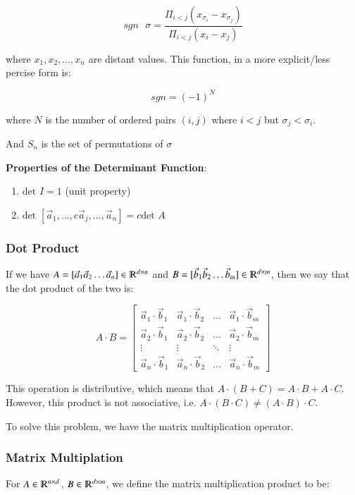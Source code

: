 \documentclass [12 pt, twoside] {book}
\newcommand\+{\text{ }}
\newcommand{\det}{\text{det }}
\begin{document}
$$sgn \+ \sigma = \frac{\Pi_{i < j} (x_{\sigma_i} - x_{\sigma_j})}{\Pi_{i
< j} (x_i - x_j)}$$

where $x_1, x_2, \dots, x_n$ are distant values. This function, in a more
explicit/less percise form is:

$$sgn = (-1)^N$$

where $N$ is the number of ordered pairs $(i, j)$ where $i < j$ but $\sigma_j <
\sigma_i$.

And $S_n$ is the set of permutations of $\sigma$

\textbf{Properties of the Determinant Function}:
\begin{enumerate}
    \item $\det I = 1$ (unit property)
    \item $\det[\vec{a}_1, \dots, c\vec{a}_j, \dots, \vec{a}_n] = c \det A$
\end{enumerate}

\subsubsection{Dot Product}
If we have $A = [\vec{a}_1 \vec{a}_2 \dots \vec{a}_n]
\in \varmathbb{R}^{d \times n}$ and $B = [\vec{b}_1 \vec{b}_2 \dots \vec{b}_m]
\in \varmathbb{R}^{d \times m}$, then we say that the dot product of the two is:

\[
    A \cdot B = \left[\begin{array}{cccc}
        \vec{a}_1 \cdot \vec{b}_1 & \vec{a}_1 \cdot \vec{b}_2 & \dots &
        \vec{a}_1 \cdot \vec{b}_m \\
        \vec{a}_2 \cdot \vec{b}_1 & \vec{a}_2 \cdot \vec{b}_2 & \dots &
        \vec{a}_2 \cdot \vec{b}_m \\
        \vdots & \vdots & \ddots & \vdots\\
        \vec{a}_n \cdot \vec{b}_1 & \vec{a}_n \cdot \vec{b}_2 & \dots &
        \vec{a}_n \cdot \vec{b}_m
    \end{array}\right]
\]

This operation is distributive, which means that $A \cdot (B + C) = A \cdot B +
A \cdot C$. However, this product is not associative, i.e. $A \cdot (B \cdot C)
\neq (A \cdot B) \cdot C$.

To solve this problem, we have the matrix multiplication operator.

\subsubsection{Matrix Multiplation}
For $A \in \varmathbb{R}^{n\times d}$, $B \in
\varmathbb{R}^{d\times m}$, we define the matrix multiplication product to be:
\end{document}
